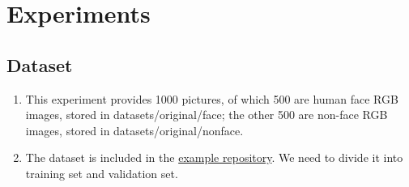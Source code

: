 \documentclass[journal, a4paper]{IEEEtran}
\begin{document}
\section{Experiments}
\subsection{Dataset}
\begin{enumerate}
	\item This experiment provides 1000 pictures, of which 500 are human face RGB images, stored in datasets/original/face; the other 500 are non-face RGB images, stored in datasets/original/nonface.
	\item The dataset is included in the \href{https://github.com/wujiaju/ML2018-lab-03}{example repository}. We need to divide it into training set and validation set.
\end{enumerate}
\end{document}
